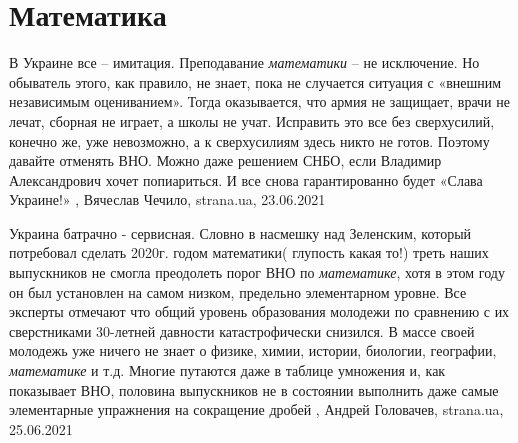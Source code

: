  
 
 
 
 
\chapter{Математика}
\label{sec:slova.matematika}

В Украине все – имитация. Преподавание \emph{математики} – не исключение. Но обыватель
этого, как правило, не знает, пока не случается ситуация с «внешним независимым
оцениванием». Тогда оказывается, что армия не защищает, врачи не лечат, сборная
не играет, а школы не учат. Исправить это все без сверхусилий, конечно же, уже
невозможно, а к сверхусилиям здесь никто не готов. Поэтому давайте отменять
ВНО. Можно даже решением СНБО, если Владимир Александрович хочет попиариться. И
все снова гарантированно будет «Слава Украине!»
, Вячеслав Чечило, strana.ua, 23.06.2021


Украина батрачно - сервисная.  Словно в насмешку над Зеленским, который
потребовал сделать 2020г. годом математики( глупость какая то!) треть наших
выпускников не смогла преодолеть порог ВНО по \emph{математике}, хотя в этом году он
был установлен на самом низком, предельно элементарном уровне.  Все эксперты
отмечают что общий уровень образования молодежи по сравнению с их сверстниками
30-летней давности катастрофически снизился. В массе своей молодежь уже ничего
не знает о физике, химии, истории, биологии, географии, \emph{математике} и т.д.
Многие путаются даже в таблице умножения и, как показывает ВНО, половина
выпускников не в состоянии выполнить даже самые элементарные упражнения на
сокращение дробей
, 
Андрей Головачев, strana.ua, 25.06.2021

